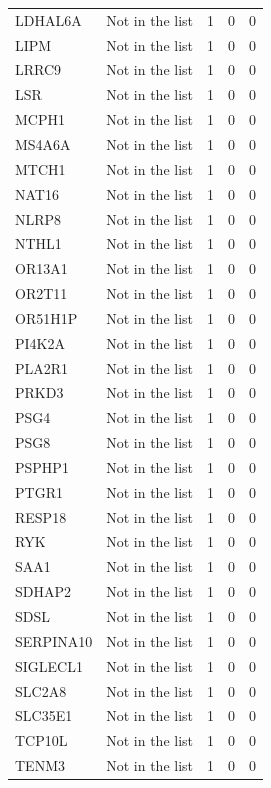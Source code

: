 \documentclass[12pt,twoside]{reedthesis}
\theoremstyle{definition}
\theoremstyle{definition}
\theoremstyle{remark}
\begin{document}
\begin{longtable}[t]{llrrr}
  \addlinespace
  LDHAL6A & Not in the list & 1 & 0 & 0\\
  LIPM & Not in the list & 1 & 0 & 0\\
  LRRC9 & Not in the list & 1 & 0 & 0\\
  LSR & Not in the list & 1 & 0 & 0\\
  MCPH1 & Not in the list & 1 & 0 & 0\\
  \addlinespace
  MS4A6A & Not in the list & 1 & 0 & 0\\
  MTCH1 & Not in the list & 1 & 0 & 0\\
  NAT16 & Not in the list & 1 & 0 & 0\\
  NLRP8 & Not in the list & 1 & 0 & 0\\
  NTHL1 & Not in the list & 1 & 0 & 0\\
  \addlinespace
  OR13A1 & Not in the list & 1 & 0 & 0\\
  OR2T11 & Not in the list & 1 & 0 & 0\\
  OR51H1P & Not in the list & 1 & 0 & 0\\
  PI4K2A & Not in the list & 1 & 0 & 0\\
  PLA2R1 & Not in the list & 1 & 0 & 0\\
  \addlinespace
  PRKD3 & Not in the list & 1 & 0 & 0\\
  PSG4 & Not in the list & 1 & 0 & 0\\
  PSG8 & Not in the list & 1 & 0 & 0\\
  PSPHP1 & Not in the list & 1 & 0 & 0\\
  PTGR1 & Not in the list & 1 & 0 & 0\\
  \addlinespace
  RESP18 & Not in the list & 1 & 0 & 0\\
  RYK & Not in the list & 1 & 0 & 0\\
  SAA1 & Not in the list & 1 & 0 & 0\\
  SDHAP2 & Not in the list & 1 & 0 & 0\\
  SDSL & Not in the list & 1 & 0 & 0\\
  \addlinespace
  SERPINA10 & Not in the list & 1 & 0 & 0\\
  SIGLECL1 & Not in the list & 1 & 0 & 0\\
  SLC2A8 & Not in the list & 1 & 0 & 0\\
  SLC35E1 & Not in the list & 1 & 0 & 0\\
  TCP10L & Not in the list & 1 & 0 & 0\\
  \addlinespace
  TENM3 & Not in the list & 1 & 0 & 0\\

\end{longtable}
\end{document}
